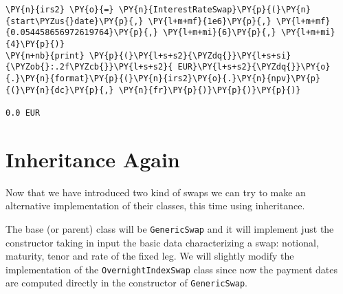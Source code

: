 \begin{tcolorbox}[breakable, size=fbox, boxrule=1pt, pad at break*=1mm,colback=cellbackground, colframe=cellborder]
\begin{Verbatim}[commandchars=\\\{\}]
\PY{n}{irs2} \PY{o}{=} \PY{n}{InterestRateSwap}\PY{p}{(}\PY{n}{start\PYZus{}date}\PY{p}{,} \PY{l+m+mf}{1e6}\PY{p}{,} \PY{l+m+mf}{0.054458656972619764}\PY{p}{,} \PY{l+m+mi}{6}\PY{p}{,} \PY{l+m+mi}{4}\PY{p}{)}
\PY{n+nb}{print} \PY{p}{(}\PY{l+s+s2}{\PYZdq{}}\PY{l+s+si}{\PYZob{}:.2f\PYZcb{}}\PY{l+s+s2}{ EUR}\PY{l+s+s2}{\PYZdq{}}\PY{o}{.}\PY{n}{format}\PY{p}{(}\PY{n}{irs2}\PY{o}{.}\PY{n}{npv}\PY{p}{(}\PY{n}{dc}\PY{p}{,} \PY{n}{fr}\PY{p}{)}\PY{p}{)}\PY{p}{)}

0.0 EUR
\end{Verbatim}
\end{tcolorbox}
    
\section{Inheritance Again}
Now that we have introduced two kind of swaps we can try to make an alternative implementation of their classes, this time using inheritance.

The base (or parent) class will be \texttt{GenericSwap} and it will implement just the constructor taking in input the basic data characterizing a swap: notional, maturity, tenor and rate of the fixed leg. We will slightly modify the implementation of the \texttt{OvernightIndexSwap} class since now the payment dates are computed directly in the constructor of \texttt{GenericSwap}.

